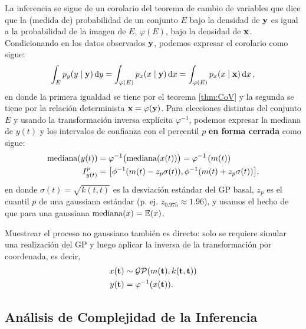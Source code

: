 La inferencia se sigue de un corolario del teorema de cambio de variables que dice que la (medida de) probabilidad de un conjunto \(E\) bajo la densidad de \(\mathbf{y}\) es igual a la probabilidad de la imagen de \(E\), \(\varphi(E)\), bajo la densidad de \(\mathbf{x}\). Condicionando en los datos observados \(\mathbf{y}\), podemos expresar el corolario como sigue:
\begin{align*}
	\int_{E} p_{y}(y \mid \mathbf{y}) \dd{y} = \int_{\varphi(E)} p_{x}(x \mid \mathbf{y}) \dd{x} = \int_{\varphi(E)} p_{x}(x \mid \mathbf{x}) \dd{x},
\end{align*}
en donde la primera igualdad se tiene por el teorema \ref{thm:CoV} y la segunda se tiene por la relación determinista \(\mathbf{x} = \varphi(\mathbf{y})\). Para elecciones distintas del conjunto \(E\) y usando la transformación inversa explícita \(\varphi^{-1}\), podemos expresar la mediana de \(y(t)\) y los intervalos de confianza con el percentil \(p\) \textbf{en forma cerrada} como sigue:
\begin{align*}
	\operatorname{mediana}({y(t)})	&= \varphi^{-1}\bigl(\operatorname{mediana}({x(t)})\bigr) = \varphi^{-1}\left(m(t)\right)\\
	I_{y(t)}^p		&= \bigl[\phi^{-1}(m(t) - z_{p}\sigma(t)), \phi^{-1}(m(t) + z_{p}\sigma(t))\bigr],
\end{align*} 
en donde \(\sigma(t) = \sqrt{k(t, t)}\) es la desviación estándar del GP basal, \(z_{p}\) es el cuantil \(p\) de una gaussiana estándar (p. ej. \(z_{0.975} \approx 1.96\)), y usamos el hecho de que para una gaussiana \(\operatorname{mediana}(x) = \mathbb{E}(x)\).

Muestrear el proceso no gaussiano también es directo: solo se requiere simular una realización del GP y luego aplicar la inversa de la transformación por coordenada, es decir,
\begin{align*}
	x(\mathbf{t})	&\sim \operatorname{\mathcal{GP}}(m(\mathbf{t}), k(\mathbf{t}, \mathbf{t}))\\
	y(\mathbf{t})	&= \varphi^{-1}(x(\mathbf{t})).
\end{align*}

\subsection{Análisis de Complejidad de la Inferencia}

